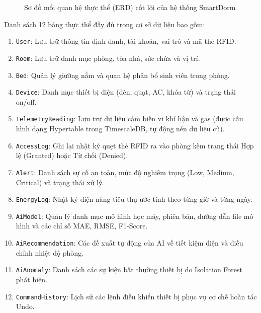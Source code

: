 \begin{figure}[H]
    \caption{Sơ đồ mối quan hệ thực thể (ERD) cốt lõi của hệ thống SmartDorm}
    \label{fig:erd_diagram}
\end{figure}

Danh sách 12 bảng thực thể đầy đủ trong cơ sở dữ liệu bao gồm:
\begin{enumerate}
    \item \texttt{User}: Lưu trữ thông tin định danh, tài khoản, vai trò và mã thẻ RFID.
    \item \texttt{Room}: Lưu trữ danh mục phòng, tòa nhà, sức chứa và vị trí.
    \item \texttt{Bed}: Quản lý giường nằm và quan hệ phân bổ sinh viên trong phòng.
    \item \texttt{Device}: Danh mục thiết bị điện (đèn, quạt, AC, khóa từ) và trạng thái on/off.
    \item \texttt{TelemetryReading}: Lưu trữ dữ liệu cảm biến vi khí hậu và gas (được cấu hình dạng Hypertable trong TimescaleDB, tự động nén dữ liệu cũ).
    \item \texttt{AccessLog}: Ghi lại nhật ký quẹt thẻ RFID ra vào phòng kèm trạng thái Hợp lệ (Granted) hoặc Từ chối (Denied).
    \item \texttt{Alert}: Danh sách sự cố an toàn, mức độ nghiêm trọng (Low, Medium, Critical) và trạng thái xử lý.
    \item \texttt{EnergyLog}: Nhật ký điện năng tiêu thụ ước tính theo từng giờ và từng ngày.
    \item \texttt{AiModel}: Quản lý danh mục mô hình học máy, phiên bản, đường dẫn file mô hình và các chỉ số MAE, RMSE, F1-Score.
    \item \texttt{AiRecommendation}: Các đề xuất tự động của AI về tiết kiệm điện và điều chỉnh nhiệt độ phòng.
    \item \texttt{AiAnomaly}: Danh sách các sự kiện bất thường thiết bị do Isolation Forest phát hiện.
    \item \texttt{CommandHistory}: Lịch sử các lệnh điều khiển thiết bị phục vụ cơ chế hoàn tác Undo.
\end{enumerate}

